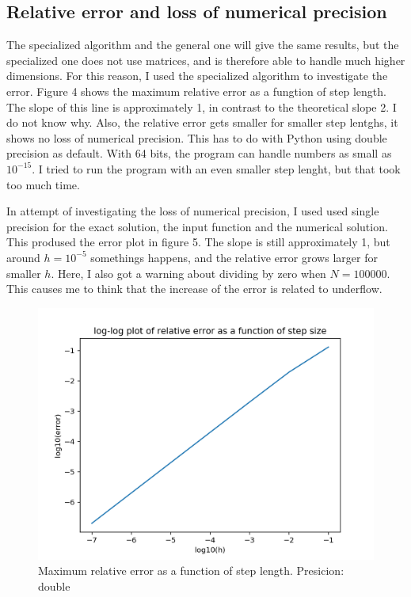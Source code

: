 \documentclass{article}
\begin{document}
\subsection{Relative error and loss of numerical precision}
The specialized algorithm and the general one will give the same results, but the specialized one does not use matrices, and is therefore able to handle much higher dimensions. For this reason, I used the specialized algorithm to investigate the error. Figure 4 shows the maximum relative error as a fungtion of step length. The slope of this line is approximately 1, in contrast to the theoretical slope 2. I do not know why. Also, the relative error gets smaller for smaller step lentghs, it shows no loss of numerical precision.  This has to do with Python using double precision as default. With 64 bits, the program can handle numbers as small as $10^{-15}$. I tried to run the program with an even smaller step lenght, but that took too much time. 

In attempt of investigating the loss of numerical precision, I used used single precision for the exact solution, the input function and the numerical solution. This prodused the error plot in figure 5. The slope is still approximately 1, but around $h=10^{-5}$ somethings happens, and the relative error grows larger for smaller $h$. Here, I also got a warning about dividing by zero when $N=100 000$. This causes me to think that the increase of the error is related to underflow. 
\begin{figure}
  \includegraphics[width=\linewidth]{errorfigdoublefloat.png}
  \caption{Maximum relative error as a function of step length. Presicion: double}
  \label{fig:1000 grid points}
\end{figure}
\end{document}
